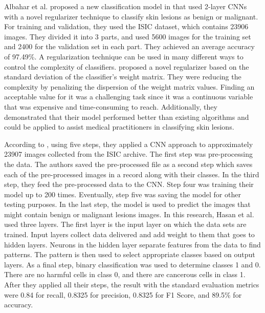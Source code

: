 \documentclass[12pt]{diazessay}
\begin{document}
    Albahar et al. proposed a new classification model in \cite{Albahar2019-wf} that used 2-layer CNNs with a novel regularizer technique to classify skin lesions as benign or malignant. For training and validation, they used the ISIC dataset, which contains 23906 images. They divided it into 3 parts, and used 5600 images for the training set and 2400 for the validation set in each part. They achieved an average accuracy of 97.49\%. A regularization technique can be used in many different ways to control the complexity of classifiers. \cite{Albahar2019-wf} proposed a novel regularizer based on the standard deviation of the classifier's weight matrix. They were reducing the complexity by penalizing the dispersion of the weight matrix values. Finding an acceptable value for it was a challenging task since it was a continuous variable that was expensive and time-consuming to reach. Additionally, they demonstrated that their model performed better than existing algorithms and could be applied to assist medical practitioners in classifying skin lesions.
    
    According to \cite{Hasan2019-le}, using five steps, they applied a CNN approach to approximately 23907 images collected from the ISIC archive. The first step was pre-processing the data. The authors saved the pre-processed file as a second step which saves each of the pre-processed images in a record along with their classes. In the third step, they feed the pre-processed data to the CNN. Step four was training their model up to 200 times. Eventually, step five was saving the model for other testing purposes. In the last step, the model is used to predict the images that might contain benign or malignant lesions images. In this research, Hasan et al. \cite{Hasan2019-le} used three layers. The first layer is the input layer on which the data sets are trained. Input layers collect data delivered and add weight to them that goes to hidden layers. Neurons in the hidden layer separate features from the data to find patterns. The pattern is then used to select appropriate classes based on output layers. As a final step, binary classification was used to determine classes 1 and 0. There are no harmful cells in class 0, and there are cancerous cells in class 1. After they applied all their steps, the result with the standard evaluation metrics were 0.84 for recall, 0.8325 for precision, 0.8325 for F1 Score, and 89.5\% for accuracy.
    
\end{document}
